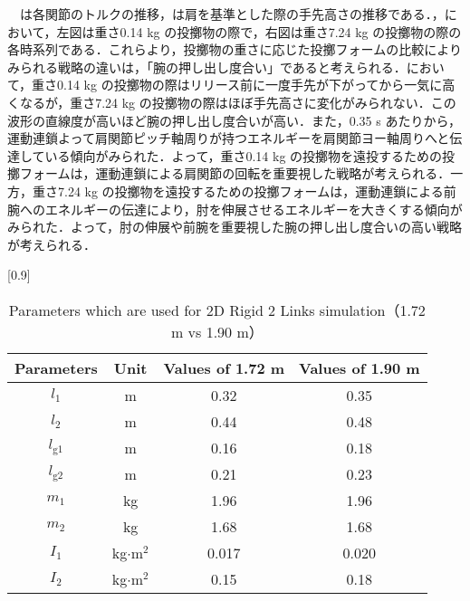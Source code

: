 　は各関節のトルクの推移，は肩を基準とした際の手先高さの推移である．，において，左図は重さ0.14 kg の投擲物の際で，右図は重さ7.24 kg の投擲物の際の各時系列である．これらより，投擲物の重さに応じた投擲フォームの比較によりみられる戦略の違いは，「腕の押し出し度合い」であると考えられる．において，重さ0.14 kg の投擲物の際はリリース前に一度手先が下がってから一気に高くなるが，重さ7.24 kg の投擲物の際はほぼ手先高さに変化がみられない．この波形の直線度が高いほど腕の押し出し度合いが高い．また，0.35 s あたりから，運動連鎖よって肩関節ピッチ軸周りが持つエネルギーを肩関節ヨー軸周りへと伝達している傾向がみられた．よって，重さ0.14 kg の投擲物を遠投するための投擲フォームは，運動連鎖による肩関節の回転を重要視した戦略が考えられる．一方，重さ7.24 kg の投擲物を遠投するための投擲フォームは，運動連鎖による前腕へのエネルギーの伝達により，肘を伸展させるエネルギーを大きくする傾向がみられた．よって，肘の伸展や前腕を重要視した腕の押し出し度合いの高い戦略が考えられる．
\begin{table}[tb]
  \begin{center}
    \caption{Parameters which are used for 2D Rigid 2 Links simulation（1.72 m vs 1.90 m）}
    \scalebox{0.9}[0.9]{
    \begin{tabular}{c|c|c|c}
      \hline
      Parameters & Unit & Values of 1.72 m & Values of 1.90 m \\
      \hline
      $l_{1}$ & m & 0.32 & 0.35 \\
      $l_{2}$ & m & 0.44 & 0.48 \\
      $l_{\mathrm{g1}}$ & m & 0.16 & 0.18 \\
      $l_{\mathrm{g2}}$ & m & 0.21 & 0.23 \\
      $m_{1}$ & kg & 1.96 & 1.96\\
      $m_{2}$ & kg & 1.68 & 1.68\\
      $I_{1}$ & kg$\cdot$$\mathrm{m}^2$ & 0.017 & 0.020 \\
      $I_{2}$ & kg$\cdot$$\mathrm{m}^2$ & 0.15 & 0.18 \\
      \hline
    \end{tabular}
    }
  \end{center}
\end{table}
